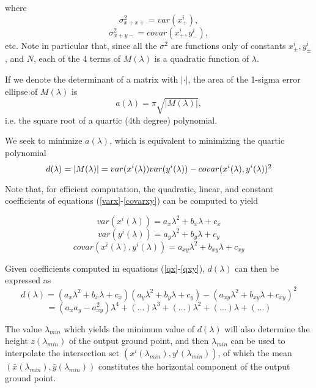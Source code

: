 \documentclass[11pt]{amsart}
\begin{document}
where
$$\sigma^2_{x+x+}=var(x^i_+),$$
$$\sigma^2_{x+y-}=covar(x^i_+, y^i_-),$$
etc. Note in particular that, since all the $\sigma^2$ are functions only of constants $x^i_\pm, y^i_\pm$, and $N$, each of the 4 terms of $M(\lambda)$ is a quadratic function of $\lambda$.

If we denote the determinant of a matrix with $|\cdot|$, the area of the
1-sigma error ellipse of $M(\lambda)$ is
$$a(\lambda) = \pi\sqrt{|M(\lambda)|},$$
i.e. the square root of a quartic (4th degree) polynomial.

We seek to minimize $a(\lambda)$, which is equivalent to minimizing
the quartic polynomial 
\begin{equation*}
d(\lambda) = |M(\lambda)| \\
           = var(x^i(\lambda))var(y^i(\lambda)) - covar(x^i(\lambda),y^i(\lambda))^2
\end{equation*}

Note that, for efficient computation, the quadratic, linear, and
constant coefficients of equations (\ref{varx}-\ref{covarxy}) can be
computed to yield

\begin{equation}\label{qx}
var(x^i(\lambda)) = a_x\lambda^2 + b_x\lambda + c_x
\end{equation}
\begin{equation}\label{qy}
var(y^i(\lambda)) = a_y\lambda^2 + b_y\lambda + c_y
\end{equation}
\begin{equation}\label{qxy}
covar(x^i(\lambda),y^i(\lambda)) = a_{xy}\lambda^2 + b_{xy}\lambda + c_{xy}
\end{equation}

Given coefficients computed in equations (\ref{qx}-\ref{qxy}),
$d(\lambda)$ can then be expressed as
\begin{equation*}\label{d}
d(\lambda) = (a_x\lambda^2 + b_x\lambda + c_x)(a_y\lambda^2 + b_y\lambda + c_y) - 
(a_{xy}\lambda^2 + b_{xy}\lambda + c_{xy})^2
\end{equation*}
\begin{equation}
= (a_xa_y-a_{xy}^2)\lambda^4 + (\ldots)\lambda^3 + (\ldots)\lambda^2 + (\ldots)\lambda + (\ldots)
\end{equation}

The value $\lambda_{min}$ which yields the minimum value of
$d(\lambda)$ will also determine the height $z(\lambda_{min})$ of the
output ground point, and then $\lambda_{min}$ can be used to
interpolate the intersection set
$(x^i(\lambda_{min}),y^i(\lambda_{min}))$, of which the mean
$(\bar{x}(\lambda_{min}),\bar{y}(\lambda_{min}))$ constitutes the
horizontal component of the output ground point.
\end{document}
